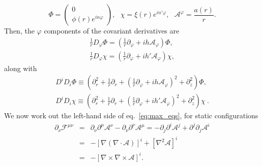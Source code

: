 \begin{equation}
\Phi = \begin{pmatrix} 0 \\
  \phi(r)e^{in\varphi}\end{pmatrix},
   \ \ \ \chi = \xi(r) e^{in'\varphi}, \ \ \ \mathcal{A}^{\varphi}= \frac{a(r)}{r}.
\end{equation}
 Then, the $\varphi$ components of the covariant derivatives are
\begin{eqnarray}
	\frac{1}{r}D_{\varphi}\Phi = \left(\frac{1}{r}\partial_{\varphi} + ih\mathcal{A}_{\varphi}\right)\Phi, \nonumber \\
	 \frac{1}{r}D_{\varphi}\chi = \left(\frac{1}{r}\partial_{\varphi} + ih'\mathcal{A}_{\varphi}\right)\chi ,
\end{eqnarray}
along with
\begin{eqnarray}
	D^iD_i \Phi\equiv \left(\partial_r^2 + \frac{1}{r}\partial_r +\left(\frac{1}{r}\partial_{\varphi}+ih\mathcal{A}_{\varphi}\right)^2 +\partial^2_z\right)\Phi, \nonumber \\
	D^iD_i \chi\equiv \left(\partial_r^2 + \frac{1}{r}\partial_r +\left(\frac{1}{r}\partial_{\varphi}+ih'\mathcal{A}_{\varphi}\right)^2 +\partial^2_z\right)\chi \ .
\end{eqnarray}
We now work out the left-hand side of eq.\ \eqref{eq:max_eqs}, for static configurations
\begin{eqnarray}
\label{eq:vec_rel_max}
	\partial_{\nu}\mathcal{F}^{\mu\nu}  & = & \partial_{\nu} \partial^{\mu}\mathcal{A}^{\nu}-\partial_{\nu}\partial^{\nu}\mathcal{A}^{\mu} =-\partial_j\partial^i\mathcal{A}^j+\partial^j\partial_j\mathcal{A}^i \nonumber \\
	 & = &  -\left[\nabla(\nabla\cdot \mathcal{A})\right]^i+\left[ \nabla^2 \mathcal{A}\right]^i\nonumber \\
	 & = & - \left[\nabla\times\nabla\times\mathcal{A}\right]^i.
\end{eqnarray}
